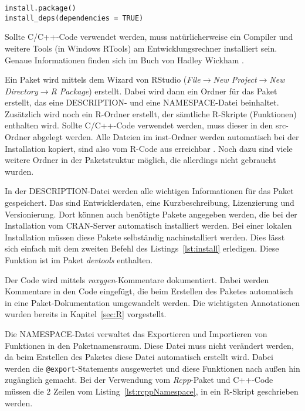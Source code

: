 \begin{lstlisting}[caption=Installation eines Paketes und dessen Abhängigkeiten, label={lst:install}, float=!th]
install.package()
install_deps(dependencies = TRUE)
\end{lstlisting}

Sollte C/C++-Code verwendet werden, muss natürlicherweise ein Compiler und weitere Tools (in Windows RTools) am Entwicklungsrechner installiert sein. Genaue Informationen finden sich im Buch von Hadley Wickham \cite[18 ff.]{wickham2015r}.

Ein Paket wird mittels dem Wizard von RStudio (\emph{File$\rightarrow$New Project$\rightarrow$New Directory$\rightarrow$R Package}) erstellt. Dabei wird dann ein Ordner für das Paket erstellt, das eine DESCRIPTION- und eine NAMESPACE-Datei beinhaltet. Zusätzlich wird noch ein R-Ordner erstellt, der sämtliche R-Skripte (Funktionen) enthalten wird. Sollte C/C++-Code verwendet werden, muss dieser in den src-Ordner abgelegt werden. Alle Dateien im inst-Ordner werden automatisch bei der Installation kopiert, sind also vom R-Code aus erreichbar \cite[196 ff.]{wickham2015r}. Noch dazu sind viele weitere Ordner in der Paketstruktur möglich, die allerdings nicht gebraucht wurden. \cite[28 ff.]{wickham2015r}

In der DESCRIPTION-Datei werden alle wichtigen Informationen für das Paket gespeichert. Das sind Entwicklerdaten, eine Kurzbeschreibung, Lizenzierung und Versionierung. Dort können auch benötigte Pakete angegeben werden, die bei der Installation vom CRAN-Server automatisch installiert werden. Bei einer lokalen Installation müssen diese Pakete selbständig nachinstalliert werden. Dies lässt sich einfach mit dem zweiten Befehl des Listings~\ref{lst:install} erledigen. Diese Funktion ist im Paket \emph{devtools} enthalten. \cite[67-82]{wickham2015r}

Der Code wird mittels \emph{roxygen}-Kommentare dokumentiert. Dabei werden Kommentare in den Code eingefügt, die beim Erstellen des Paketes automatisch in eine Paket-Dokumentation umgewandelt werden. Die wichtigsten Annotationen wurden bereits in Kapitel~\ref{sec:R} vorgestellt. \cite[83-110]{wickham2015r}

Die NAMESPACE-Datei verwaltet das Exportieren und Importieren von Funktionen in den Paketnamensraum. Diese Datei muss nicht verändert werden, da beim Erstellen des Paketes diese Datei automatisch erstellt wird. Dabei werden die \texttt{@export}-Statements ausgewertet und diese Funktionen nach außen hin zugänglich gemacht. Bei der Verwendung vom \emph{Rcpp}-Paket und C++-Code müssen die 2 Zeilen vom Listing~\ref{lst:rcppNamespace}, in ein R-Skript geschrieben werden. \cite[144-160]{wickham2015r}


